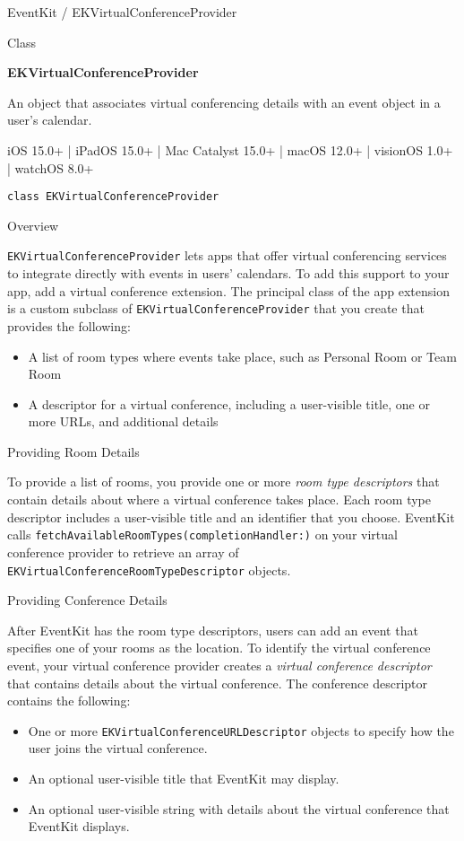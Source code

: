 \documentclass{article}
\title{}
\author{}
\date{}
\begin{document}
EventKit / EKVirtualConferenceProvider

Class

\textbf{EKVirtualConferenceProvider}

An object that associates virtual conferencing details with an event object in a user's calendar.

iOS 15.0+ | iPadOS 15.0+ | Mac Catalyst 15.0+ | macOS 12.0+ | visionOS 1.0+ | watchOS 8.0+

\texttt{class EKVirtualConferenceProvider}

Overview

\texttt{EKVirtualConferenceProvider} lets apps that offer virtual conferencing services to integrate directly with events in users' calendars. To add this support to your app, add a virtual conference extension. The principal class of the app extension is a custom subclass of \texttt{EKVirtualConferenceProvider} that you create that provides the following:

\begin{itemize}
    \item A list of room types where events take place, such as Personal Room or Team Room
    \item A descriptor for a virtual conference, including a user-visible title, one or more URLs, and additional details
\end{itemize}

Providing Room Details

To provide a list of rooms, you provide one or more \textit{room type descriptors} that contain details about where a virtual conference takes place. Each room type descriptor includes a user-visible title and an identifier that you choose. EventKit calls \texttt{fetchAvailableRoomTypes(completionHandler:)} on your virtual conference provider to retrieve an array of \texttt{EKVirtualConferenceRoomTypeDescriptor} objects.

Providing Conference Details

After EventKit has the room type descriptors, users can add an event that specifies one of your rooms as the location. To identify the virtual conference event, your virtual conference provider creates a \textit{virtual conference descriptor} that contains details about the virtual conference. The conference descriptor contains the following:

\begin{itemize}
    \item One or more \texttt{EKVirtualConferenceURLDescriptor} objects to specify how the user joins the virtual conference.
    \item An optional user-visible title that EventKit may display.
    \item An optional user-visible string with details about the virtual conference that EventKit displays.
\end{itemize}
\end{document}
